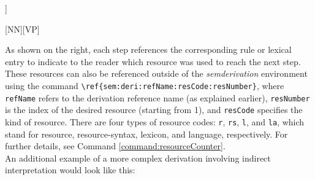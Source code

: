 \documentclass[10pt, a4paper]{article}
\begin{document}
	\begin{semcalc}[\stwo]
		\begin{semtreesem}
			\begin{forest}
				[{\e{Peter sleeps}\\S:\typet},name=0
				[{\e{Peter}\\NN:\typee},name=00]
				[{\e{sleeps}\\V:\typeet},name=01]
				]
			\end{forest}
		\end{semtreesem}
		\begin{semlang}
		\end{semlang}
		\begin{semrule}
			\rsrdesbjpred
		\end{semrule}
		\begin{semlex}
		\end{semlex}
		\begin{semderi}
		\end{semderi}
	\end{semcalc}
	As shown on the right, each step references the corresponding rule or lexical entry to indicate to the reader which resource was used to reach the next step. These resources can also be referenced outside of the \textit{semderivation} environment using the command \verb=\ref{sem:deri:refName:resCode:resNumber}=, where \texttt{refName} refers to the derivation reference name (as explained earlier), \texttt{resNumber} is the index of the desired resource (starting from 1), and \texttt{resCode} specifies the kind of resource. There are four types of resource codes: \texttt{r}, \texttt{rs}, \texttt{l}, and \texttt{la}, which stand for resource, resource-syntax, lexicon, and language, respectively. For further details, see Command \ref{command:resourceCounter}.
	\\
	An additional example of a more complex derivation involving indirect interpretation would look like this:
\end{document}
